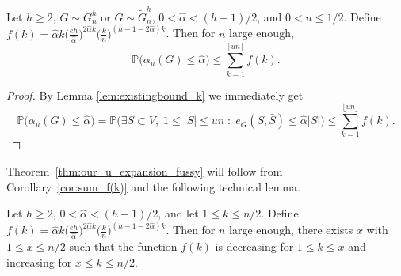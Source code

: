 \documentclass[runningheads, envcountsame, smallextended]{llncs}
\newcommand{\pr}{{\mathbb P}}
\numberwithin{theorem}{section}
\numberwithin{definition}{section}
\numberwithin{lemma}{section}
\numberwithin{corollary}{section}
\numberwithin{proposition}{section}
\numberwithin{conjecture}{section}
\numberwithin{remark}{section}
\numberwithin{equation}{section}
\begin{document}
\begin{corollary}\label{cor:sum_f(k)}
Let $h \geq 2$,  $G\sim G_n^h$ or $G \sim \tilde{G}_n^h$, $0 < \hat\alpha < (h-1)/2$, and $0 < u \leq 1/2$. Define
	$f(k) = \hat\alpha k \big(\frac{eh}{\hat\alpha}\big)^{2\hat\alpha k} \big( \frac{k}{n}\big)^{(h-1-2\hat\alpha)k}$.
	Then for $n$ large enough,  
	\[
	\pr \Big(\alpha_u(G) \leq \hat\alpha  \Big) \leq \sum_{k=1}^{\lfloor un \rfloor} f(k).
	\]
\end{corollary}
\begin{proof}
	By Lemma \ref{lem:existingbound_k} we immediately get
	\[
		\pr \big(\alpha_u(G) \leq \hat\alpha  \big)  = \pr \Big(\exists S \subset V,\; 1 \leq |S|\leq un \; : \; e_G(S, \bar{S} ) \leq \hat\alpha |S| \Big) \leq \sum_{k=1}^{\lfloor un \rfloor} 
        f(k).
	\]
\end{proof}
%
%
%
Theorem~\ref{thm:our_u_expansion_fussy} will follow from Corollary~\ref{cor:sum_f(k)} and the following technical lemma.

\begin{lemma}\label{lem:functionf}
	Let $h \geq 2$, $0 < \hat\alpha < (h-1)/2$, and let $1 \leq k \leq n/2$. Define
	$f(k) = \hat\alpha k \big(\frac{eh}{\hat\alpha}\big)^{2\hat\alpha k} \big( \frac{k}{n}\big)^{(h-1-2\hat\alpha)k}$. Then for $n$ large enough, there exists $x$ with $1 \leq x \leq n/2$ such that the function $f(k)$ is decreasing for $1 \leq k \leq x$ and increasing for $x \leq k \leq n/2$. 
\end{lemma}
\end{document}
